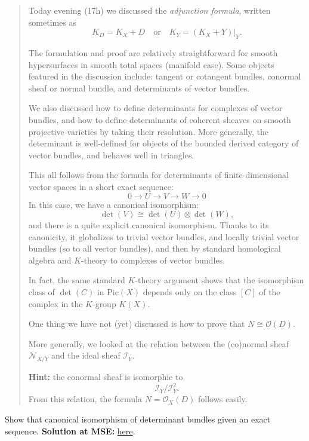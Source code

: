 \begin{quotation}
	Today evening (17h) we discussed the \emph{adjunction formula}, written sometimes as 
\[ K_D = K_X + D \quad \text{or} \quad K_Y = (K_X + Y)|_Y. \]

The formulation and proof are relatively straightforward for smooth hypersurfaces in smooth total spaces (manifold case). Some objects featured in the discussion include: tangent or cotangent bundles, conormal sheaf or normal bundle, and determinants of vector bundles.

We also discussed how to define determinants for complexes of vector bundles, and how to define determinants of coherent sheaves on smooth projective varieties by taking their resolution. More generally, the determinant is well-defined for objects of the bounded derived category of vector bundles, and behaves well in triangles.

This all follows from the formula for determinants of finite-dimensional vector spaces in a short exact sequence:
\[
0 \longrightarrow U \longrightarrow V \longrightarrow W \longrightarrow 0
\]
In this case, we have a canonical isomorphism:
\[
\det(V) \cong \det(U) \otimes \det(W),
\]
and there is a quite explicit canonical isomorphism. Thanks to its canonicity, it globalizes to trivial vector bundles, and locally trivial vector bundles (so to all vector bundles), and then by standard homological algebra and $K$-theory to complexes of vector bundles.

In fact, the same standard $K$-theory argument shows that the isomorphism class of $\det(C)$ in $\mathrm{Pic}(X)$ depends only on the class $[C]$ of the complex in the $K$-group $K(X)$.

\medskip

\noindent One thing we have not (yet) discussed is how to prove that $N \cong \mathcal{O}(D)$.

More generally, we looked at the relation between the (co)normal sheaf $\mathcal{N}_{X/Y}$ and the ideal sheaf $\mathcal{I}_Y$.

\medskip

\noindent \textbf{Hint:} the conormal sheaf is isomorphic to
\[
\mathcal{I}_Y / \mathcal{I}_Y^2.
\]
From this relation, the formula $N = \mathcal{O}_X(D)$ follows easily.
\end{quotation}

\begin{exercise}\leavevmode
Show that canonical isomorphism of determinant bundles given an exact sequence. \textbf{Solution at MSE:} \href{https://math.stackexchange.com/questions/822470/exterior-power-commutes-with-direct-sum}{here}.
\end{exercise}

